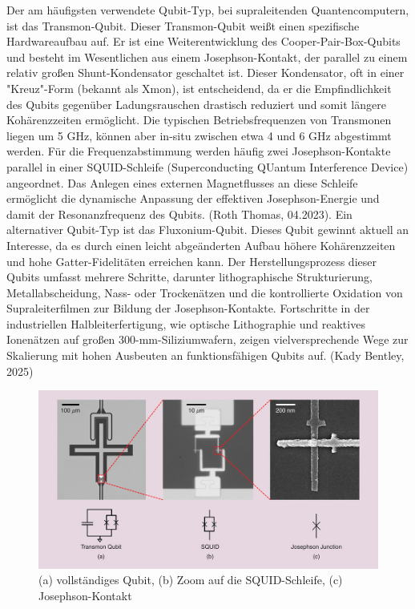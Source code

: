 Der am häufigsten verwendete Qubit-Typ, bei supraleitenden Quantencomputern, ist das Transmon-Qubit. Dieser Transmon-Qubit weißt einen spezifische Hardwareaufbau auf. Er ist eine Weiterentwicklung des Cooper-Pair-Box-Qubits und besteht im Wesentlichen aus einem Josephson-Kontakt, der parallel zu einem relativ großen Shunt-Kondensator geschaltet ist. Dieser Kondensator, oft in einer "Kreuz"-Form (bekannt als Xmon), ist entscheidend, da er die Empfindlichkeit des Qubits gegenüber Ladungsrauschen drastisch reduziert und somit längere Kohärenzzeiten ermöglicht. Die typischen Betriebsfrequenzen von Transmonen liegen um 5 GHz, können aber in-situ zwischen etwa 4 und 6 GHz abgestimmt werden. Für die Frequenzabstimmung werden häufig zwei Josephson-Kontakte parallel in einer SQUID-Schleife (Superconducting QUantum Interference Device) angeordnet. Das Anlegen eines externen Magnetflusses an diese Schleife ermöglicht die dynamische Anpassung der effektiven Josephson-Energie und damit der Resonanzfrequenz des Qubits. (Roth Thomas, 04.2023). Ein alternativer Qubit-Typ ist das Fluxonium-Qubit. Dieses Qubit gewinnt aktuell an Interesse, da es durch einen leicht abgeänderten Aufbau höhere Kohärenzzeiten und hohe Gatter-Fidelitäten erreichen kann. Der Herstellungsprozess dieser Qubits umfasst mehrere Schritte, darunter lithographische Strukturierung, Metallabscheidung, Nass- oder Trockenätzen und die kontrollierte Oxidation von Supraleiterfilmen zur Bildung der Josephson-Kontakte. Fortschritte in der industriellen Halbleiterfertigung, wie optische Lithographie und reaktives Ionenätzen auf großen 300-mm-Siliziumwafern, zeigen vielversprechende Wege zur Skalierung mit hohen Ausbeuten an funktionsfähigen Qubits auf. (Kady Bentley, 2025)

\begin{figure}[ht]
    \centering
    \includegraphics[width=1\textwidth]{images/quanten-hardware/Transmon Qubit.jpg}
    \caption{(a) vollständiges Qubit, (b) Zoom auf die SQUID-Schleife, (c) Josephson-Kontakt}
    \label{fig:transom_image}
    \end{figure}

